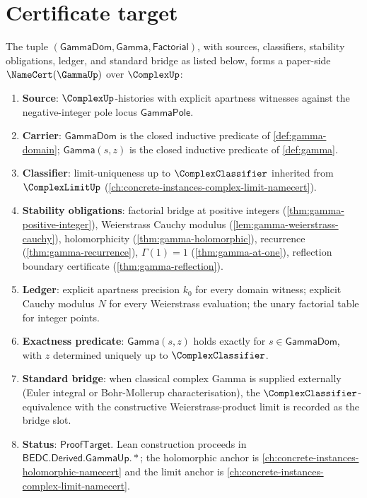 \section{Certificate target}
\label{sec:gamma-cert-target}

\begin{theorem}
\label{thm:concrete-gamma-namecert}
The tuple \((\mathsf{GammaDom}, \mathsf{Gamma}, \mathsf{Factorial})\), with sources, classifiers, stability obligations, ledger, and standard bridge as listed below, forms a paper-side \(\NameCert(\GammaUp)\) over \(\ComplexUp\):
\begin{enumerate}
  \item \textbf{Source}: \(\ComplexUp\)-histories with explicit apartness witnesses against the negative-integer pole locus \(\mathsf{GammaPole}\).
  \item \textbf{Carrier}: \(\mathsf{GammaDom}\) is the closed inductive predicate of \autoref{def:gamma-domain}; \(\mathsf{Gamma}(s, z)\) is the closed inductive predicate of \autoref{def:gamma}.
  \item \textbf{Classifier}: limit-uniqueness up to \(\ComplexClassifier\) inherited from \(\ComplexLimitUp\) (\autoref{ch:concrete-instances-complex-limit-namecert}).
  \item \textbf{Stability obligations}: factorial bridge at positive integers (\autoref{thm:gamma-positive-integer}), Weierstrass Cauchy modulus (\autoref{lem:gamma-weierstrass-cauchy}), holomorphicity (\autoref{thm:gamma-holomorphic}), recurrence (\autoref{thm:gamma-recurrence}), \(\Gamma(1) = 1\) (\autoref{thm:gamma-at-one}), reflection boundary certificate (\autoref{thm:gamma-reflection}).
  \item \textbf{Ledger}: explicit apartness precision \(k_0\) for every domain witness; explicit Cauchy modulus \(N\) for every Weierstrass evaluation; the unary factorial table for integer points.
  \item \textbf{Exactness predicate}: \(\mathsf{Gamma}(s, z)\) holds exactly for \(s \in \mathsf{GammaDom}\), with \(z\) determined uniquely up to \(\ComplexClassifier\).
  \item \textbf{Standard bridge}: when classical complex Gamma is supplied externally (Euler integral or Bohr-Mollerup characterisation), the \(\ComplexClassifier\)-equivalence with the constructive Weierstrass-product limit is recorded as the bridge slot.
  \item \textbf{Status}: \(\mathsf{ProofTarget}\). Lean construction proceeds in \(\mathsf{BEDC.Derived.GammaUp.*}\); the holomorphic anchor is \autoref{ch:concrete-instances-holomorphic-namecert} and the limit anchor is \autoref{ch:concrete-instances-complex-limit-namecert}.
\end{enumerate}
\end{theorem}
